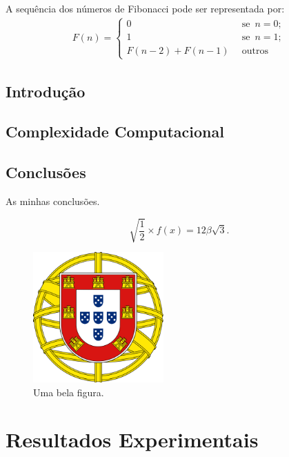 \documentclass[12pt,a4paper,headsepline,bibtotoc,twoside]{scrbook}
\begin{document}
A sequência dos números de Fibonacci pode ser representada por:
\begin{eqnarray}
  \label{eq:eq1}
  F(n) = \left\{ 
    \begin{array}{ll}
      0 & \,\,\, \text{se}\,\,\, n = 0;\\
      1 & \,\,\, \text{se}\,\,\, n = 1; \\
      F(n-2) + F(n-1) & \,\,\,\text{outros}
    \end{array}
    \right.
\end{eqnarray}


\section{Introdução}
\section{Complexidade Computacional}
\section{Conclusões}

\cleardoublepage




As minhas conclusões.


\begin{equation}
  \label{eq:esq1}
  \sqrt{\frac{1}{2}} \times f(x) = 12 \beta \sqrt{3}.
\end{equation}

\begin{figure}
  \centering
  \includegraphics[width=5cm]{2000px-Coat_of_arms_of_Portugal_(Lesser).png}
  \caption{Uma bela figura.}
  \label{fig:bela}
\end{figure}


\chapter{Resultados Experimentais}
\end{document}

